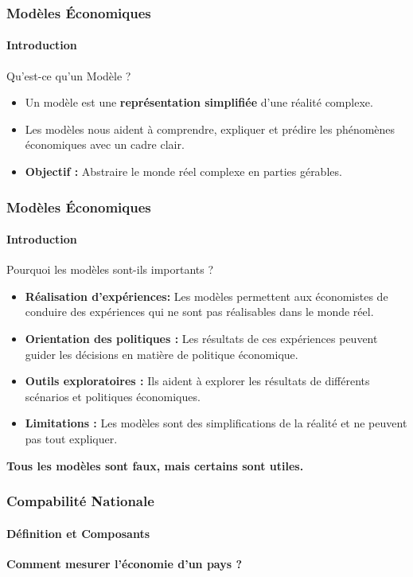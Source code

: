 \documentclass{beamer}
\begin{document}
\begin{frame}
    \frametitle{Modèles Économiques}
    \framesubtitle{Introduction}
    Qu'est-ce qu'un Modèle ?
    \pause
        \begin{itemize}
            \item Un modèle est une \textbf{représentation simplifiée} d'une réalité complexe.
            \item Les modèles nous aident à comprendre, expliquer et prédire les phénomènes économiques avec un cadre clair.
            \item \textbf{Objectif :} Abstraire le monde réel complexe en parties gérables.
        \end{itemize}
    \end{frame}
    \begin{frame}
        \frametitle{Modèles Économiques}
        \framesubtitle{Introduction}
        Pourquoi les modèles sont-ils importants ?
        \pause
        \begin{itemize}
            \item \textbf{Réalisation d'expériences:} Les modèles permettent aux économistes de conduire des expériences qui ne sont pas réalisables dans le monde réel.
            \item \textbf{Orientation des politiques :} Les résultats de ces expériences peuvent guider les décisions en matière de politique économique.
            \item \textbf{Outils exploratoires :} Ils aident à explorer les résultats de différents scénarios et politiques économiques.
            \item \pause \textbf{Limitations :} Les modèles sont des simplifications de la réalité et ne peuvent pas tout expliquer.
        \end{itemize}
        \textbf{Tous les modèles sont faux, mais certains sont utiles.}
    \end{frame} 
\begin{frame}
    \frametitle{Compabilité Nationale}
    \framesubtitle{Définition et Composants}
        \textbf{Comment mesurer l'économie d'un pays ?}
\end{frame}
\end{document}

